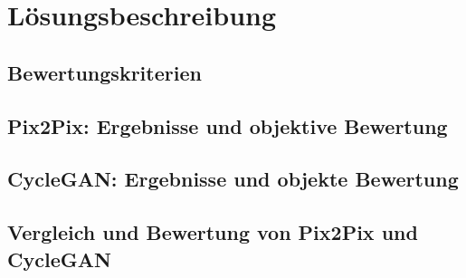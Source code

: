 \chapter{Lösungsbeschreibung}
\section{Bewertungskriterien}
\section{Pix2Pix: Ergebnisse und objektive Bewertung}
\section{CycleGAN: Ergebnisse und objekte Bewertung}
\section{Vergleich und Bewertung von Pix2Pix und CycleGAN}